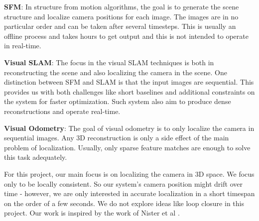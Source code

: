 \documentclass{article}
\begin{document}
\textbf{SFM}: In structure from motion algorithms, the goal is to generate the scene structure and localize camera positions for each image. The images are in no particular order and can be taken after several timesteps. This is usually an offline process and takes hours to get output and this is not intended to operate in real-time.

\textbf{Visual SLAM}: The focus in the visual SLAM techniques is both in reconstructing the scene and also localizing the camera in the scene. One distinction between SFM and SLAM is that the input images are sequential. This provides us with both challenges like short baselines and additional constraints on the system for faster optimization. Such system also aim to produce dense reconstructions and operate real-time.

\textbf{Visual Odometry}: The goal of visual odometry is to only localize the camera in sequential images. Any 3D reconstruction is only a side effect of the main problem of localization. Usually, only sparse feature matches are enough to solve this task adequately.

For this project, our main focus is on localizing the camera in 3D space. We focus only to be locally consistent. So our system's camera position might drift over time - however, we are only interested in accurate localization in a short timespan on the order of a few seconds. We do not explore ideas like loop closure in this project. Our work is inspired by the work of Nister et al \cite{vo}.
\end{document}
